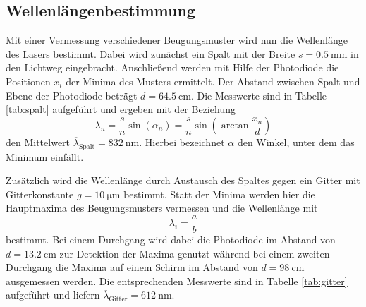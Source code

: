 \subsection{Wellenlängenbestimmung}
\label{subsec:wellenlänge}
Mit einer Vermessung verschiedener Beugungsmuster wird nun die Wellenlänge des
Lasers bestimmt.
Dabei wird zunächst ein Spalt mit der Breite $s = \SI{0.5}{\milli\meter}$ in den Lichtweg eingebracht.
Anschließend werden mit Hilfe der Photodiode die Positionen $x_i$ der Minima des Musters ermittelt.
Der Abstand zwischen Spalt und Ebene der Photodiode beträgt $d = \SI{64.5}{\centi\meter}$.
Die Messwerte sind in Tabelle \ref{tab:spalt} aufgeführt und ergeben mit der Beziehung
\begin{equation}
    \label{eq:spalt}
    \lambda_n = \frac{s}{n}\sin\!\left(\alpha_n\right) = \frac{s}{n}\sin\!\left(\arctan\frac{x_n}{d}\right)
\end{equation}
den Mittelwert $\overline{\lambda}_\text{Spalt} = \SI{832}{\nano\meter}$.
Hierbei bezeichnet $\alpha$ den Winkel, unter dem das Minimum einfällt.

Zusätzlich wird die Wellenlänge durch Austausch des Spaltes gegen ein Gitter mit Gitterkonstante $g = \SI{10}{\micro\meter}$ bestimmt.
Statt der Minima werden hier die Hauptmaxima des Beugungsmusters vermessen und die Wellenlänge mit
\begin{equation}
\label{eq:gitter}
    \lambda_i = \frac{a}{b}
\end{equation}
bestimmt.
Bei einem Durchgang wird dabei die Photodiode im Abstand von $d = \SI{13.2}{\centi\meter}$ zur Detektion der Maxima genutzt während bei einem zweiten Durchgang die Maxima auf einem Schirm im Abstand von $d = \SI{98}{\centi\meter}$ ausgemessen werden.
Die entsprechenden Messwerte sind in Tabelle \ref{tab:gitter} aufgeführt und liefern $\overline{\lambda}_\text{Gitter} = \SI{612}{\nano\meter}$.
